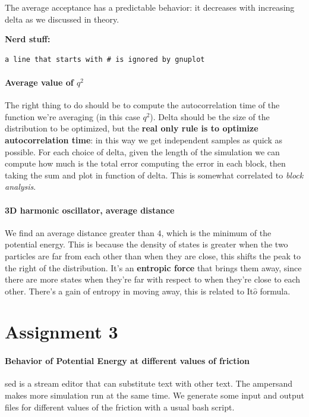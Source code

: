 \documentclass[a4paper, italian, openany]{book}
\begin{document}
\medskip

The average acceptance has a predictable behavior: it decreases with increasing delta as we discussed in theory.

\textbf{Nerd stuff:} 
\begin{lstlisting}[language=gnuplot]
a line that starts with # is ignored by gnuplot
\end{lstlisting}

\paragraph{Average value of $q^2$}

The right thing to do should be to compute the autocorrelation time of the function we're averaging (in this case $q^2$). Delta should be the size of the distribution to be optimized, but the \textbf{real only rule is to optimize autocorrelation time}: in this way we get independent samples as quick as possible. For each choice of delta, given the length of the simulation we can compute how much is the total error computing the error in each block, then taking the sum and plot in function of delta. This is somewhat correlated to \textit{block analysis}.

\paragraph{3D harmonic oscillator, average distance}

We find an average distance greater than $4$, which is the minimum of the potential energy. This is because the density of states is greater when the two particles are far from each other than when they are close, this shifts the peak to the right of the distribution. It's an \textbf{entropic force} that brings them away, since there are more states when they're far with respect to when they're close to each other. There's a gain of entropy in moving away, this is related to It$\hat{o}$ formula.

\section{Assignment 3}

\paragraph{Behavior of Potential Energy at different values of friction}

sed is a stream editor that can substitute text with other text. The ampersand makes more simulation run at the same time. We generate some input and output files for different values of the friction with a usual bash script.
\end{document}
